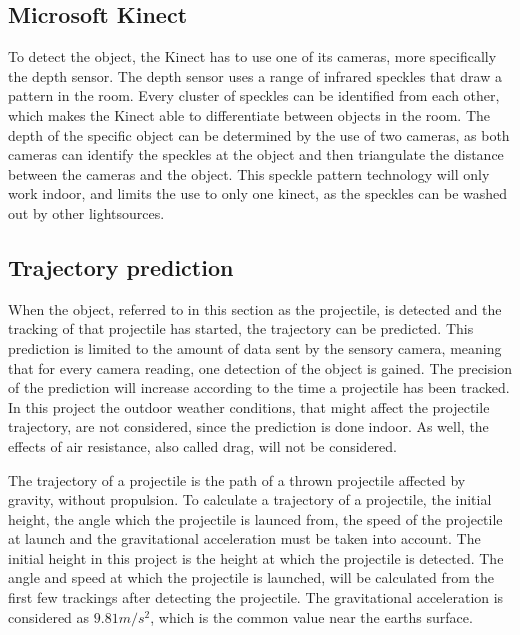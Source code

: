 \subsection{Microsoft Kinect}
\label{sec:i1Microsoft Kinect}
To detect the object, the Kinect has to use one of its cameras, more specifically the depth sensor. The depth sensor uses a range of infrared speckles that draw a pattern in the room. Every cluster of speckles can be identified from each other, which makes the Kinect able to differentiate between objects in the room. The depth of the specific object can be determined by the use of two cameras, as both cameras can identify the speckles at the object and then triangulate the distance between the cameras and the object. This speckle pattern technology will only work indoor, and limits the use to only one kinect, as the speckles can be washed out by other lightsources.
\citep{kw}

\subsection{Trajectory prediction}
\label{sec:Trajectory prediction}
When the object, referred to in this section as the projectile, is detected and the tracking of that projectile has started, the trajectory can be predicted. This prediction is limited to the amount of data sent by the sensory camera, meaning that for every camera reading, one detection of the object is gained. The precision of the prediction will increase according to the time a projectile has been tracked. \newline 
In this project the outdoor weather conditions, that might affect the projectile trajectory, are not considered,  since the prediction is done indoor. As well, the effects of air resistance, also called drag, will not be considered.

The trajectory of a projectile is the path of a thrown projectile affected by gravity, without propulsion. To calculate a trajectory of a projectile, the initial height, the angle which the projectile is launced from, the speed of the projectile at launch and the gravitational acceleration must be taken into account. \newline 
The initial height in this project is the height at which the projectile is detected. The angle and speed at which the projectile is launched, will be calculated from the first few trackings after detecting the projectile. The gravitational acceleration is considered as \(9.81m/s^2\), which is the common value near the earths surface. \newline


